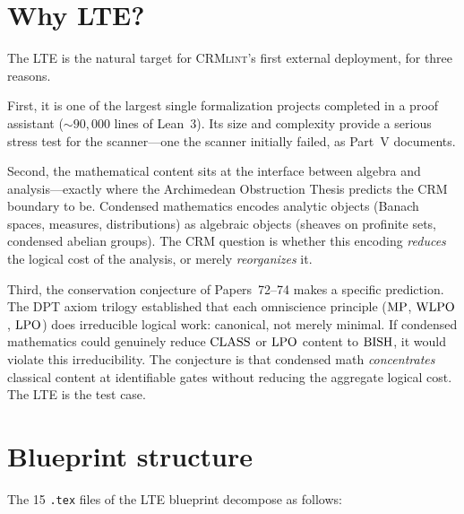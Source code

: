 \documentclass[11pt,a4paper]{article}
\theoremstyle{plain}
\theoremstyle{definition}
\newcommand{\BISH}{\textup{BISH}}
\newcommand{\MP}{\textup{MP}}
\newcommand{\WLPO}{\textup{WLPO}}
\newcommand{\LPO}{\textup{LPO}}
\newcommand{\CLASS}{\textup{CLASS}}
\newcommand{\CRMlint}{\textsc{CRMlint}}
\begin{document}
\section{Why LTE?}\label{sec:why-lte}

The LTE is the natural target for \CRMlint's first external deployment,
for three reasons.

First, it is one of the largest single formalization projects
completed in a proof assistant (${\sim}90{,}000$ lines of Lean~3).
Its size and complexity provide a serious stress test for the
scanner---one the scanner initially failed, as Part~V documents.

Second, the mathematical content sits at the interface between algebra
and analysis---exactly where the Archimedean Obstruction Thesis
predicts the CRM boundary to be.  Condensed mathematics encodes
analytic objects (Banach spaces, measures, distributions) as algebraic
objects (sheaves on profinite sets, condensed abelian groups).  The
CRM question is whether this encoding \emph{reduces} the logical cost
of the analysis, or merely \emph{reorganizes} it.

Third, the conservation conjecture of Papers~72--74 makes a specific
prediction.  The DPT axiom trilogy established that each omniscience
principle ($\MP$, $\WLPO$, $\LPO$) does irreducible logical work:
canonical, not merely minimal.  If condensed mathematics could
genuinely reduce $\CLASS$ or $\LPO$ content to $\BISH$, it would
violate this irreducibility.  The conjecture is that condensed math
\emph{concentrates} classical content at identifiable gates without
reducing the aggregate logical cost.  The LTE is the test case.

\section{Blueprint structure}\label{sec:blueprint-structure}

The 15 \texttt{.tex} files of the LTE blueprint decompose as follows:
\end{document}
